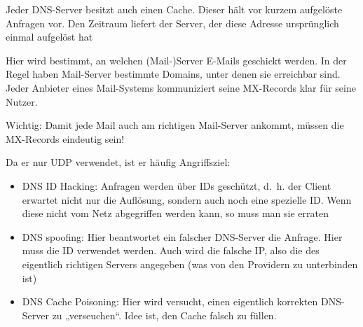 Jeder DNS-Server besitzt auch einen Cache.
Dieser hält vor kurzem aufgelöste Anfragen vor.
Den Zeitraum liefert der Server, der diese Adresse ursprünglich einmal aufgelöst hat

Hier wird bestimmt, an welchen (Mail-)Server E-Mails geschickt werden.
In der Regel haben Mail-Server bestimmte Domains, unter denen sie erreichbar sind.
Jeder Anbieter eines Mail-Systems kommuniziert seine MX-Records klar für seine Nutzer.

Wichtig: Damit jede Mail auch am richtigen Mail-Server ankommt, müssen die MX-Records eindeutig sein!

Da er nur UDP verwendet, ist er häufig Angriffsziel:
\begin{itemize}
    \item DNS ID Hacking: Anfragen werden über IDs geschützt, d.\ h. der Client erwartet nicht nur die Auflösung, sondern auch noch eine spezielle ID. Wenn diese nicht vom Netz abgegriffen werden kann, so muss man sie erraten
    \item DNS spoofing: Hier beantwortet ein falscher DNS-Server die Anfrage.
    Hier muss die ID verwendet werden.
    Auch wird die falsche IP, also die des eigentlich richtigen Servers angegeben (was von den Providern zu unterbinden ist)
    \item DNS Cache Poisoning: Hier wird versucht, einen eigentlich korrekten DNS-Server zu „verseuchen“.
    Idee ist, den Cache falsch zu füllen.
\end{itemize}